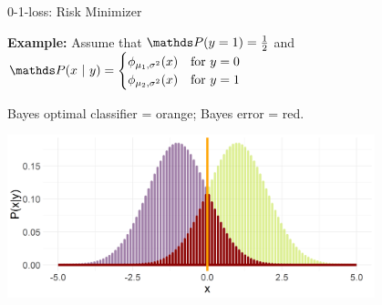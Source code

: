 \documentclass[11pt,compress,t,notes=noshow, xcolor=table]{beamer}
\begin{document}
\begin{vbframe}{0-1-loss: Risk Minimizer}






  

\framebreak 

\textbf{Example: } Assume that $\P(y = 1) = \frac{1}{2}$ and $
\P(x ~|~ y) = \begin{cases}
\phi_{\mu_1, \sigma^2}(x) & \text{for } y = 0\\ 
\phi_{\mu_2, \sigma^2}(x) & \text{for } y = 1
\end{cases}$

\vfill


Bayes optimal classifier = orange; Bayes error = red. 

\vfill

\begin{center}
\includegraphics[width = 0.8\textwidth]{figure/bayes_error_5.png} \\
\end{center}

% 
% 

\end{vbframe}

\endlecture
\end{document}
